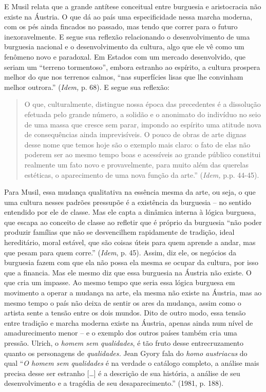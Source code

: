 E Musil relata que a grande antítese conceitual entre burguesia e
aristocracia não existe na Áustria. O que dá ao país uma especificidade
nessa marcha moderna, com os pés ainda fincados no passado, mas tendo
que correr para o futuro inexoravelmente. E segue sua reflexão
relacionando o desenvolvimento de uma burguesia nacional e o
desenvolvimento da cultura, algo que ele vê como um fenômeno novo e
paradoxal. Em Estados com um mercado desenvolvido, que seriam um
``terreno tormentoso'', embora estranho ao espírito, a cultura prospera
melhor do que nos terrenos calmos, ``nas superfícies lisas que lhe
convinham melhor outrora.'' (\emph{Idem,} p. 68). E segue sua reflexão:

\begin{quote}
O que, culturalmente, distingue nossa época das precedentes é a
dissolução efetuada pelo grande número, a solidão e o anonimato do
indivíduo no seio de uma massa que cresce sem parar, impondo ao espírito
uma atitude nova de consequências ainda imprevisíveis. O pouco de obras
de arte dignas desse nome que temos hoje são o exemplo mais claro: o
fato de elas não poderem ser ao mesmo tempo boas e acessíveis ao grande
público constitui realmente um fato novo e provavelmente, para muito
além das querelas estéticas, o aparecimento de uma nova função da
arte.'' (\emph{Idem,} p.p. 44-45).
\end{quote}

Para Musil, essa mudança qualitativa na essência mesma da arte, ou seja,
o que uma cultura nesses padrões pressupõe é a existência da burguesia
-- no sentido entendido por ele de classe. Mas ele capta a dinâmica
interna à lógica burguesa, que escapa ao conceito de classe ao refletir
que é próprio da burguesia ``não poder produzir famílias que não se
desvencilhem rapidamente de tradição, ideal hereditário, moral estável,
que são coisas úteis para quem aprende a andar, mas que pesam para quem
corre.'' (\emph{Idem}, p. 45). Assim, diz ele, os negócios da burguesia
fazem com que ela não possa ela mesma se ocupar da cultura, por isso que
a financia. Mas ele mesmo diz que essa burguesia na Áustria não existe.
O que cria um impasse. Ao mesmo tempo que seria essa lógica burguesa em
movimento a operar a mudança na arte, ela mesma não existe na Áustria,
mas ao mesmo tempo o país não deixa de sentir os ares da mudança, assim
como o artista sente a tensão entre os dois mundos. Dito de outro modo,
essa tensão entre tradição e marcha moderna existe na Áustria, apenas
ainda num nível de amadurecimento menor -- e o exemplo dos outros países
também cria uma pressão. Ulrich, o \emph{homem sem qualidades}, é tão
fruto desse entrecruzamento quanto os personagens de \emph{qualidades.}
Jean Gyory fala do \emph{homo austriacus} do qual ``\emph{O homem sem
qualidades} é na verdade o catálogo completo, a análise mais precisa
desse ser estranho {[}\ldots{}{]} é a descrição de sua história, a
análise de seu desenvolvimento e a tragédia de seu desaparecimento.''
(1981, p. 188).

